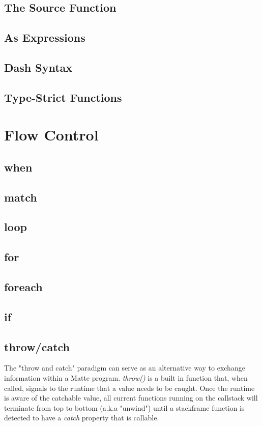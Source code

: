 \documentclass[12pt,letterpaper]{report}
\begin{document}
\section{The Source Function}
\section{As Expressions}
\section{Dash Syntax}
\section{Type-Strict Functions}
\chapter{Flow Control}
\section{when}
\section{match}
\section{loop}
\section{for}
\section{foreach}
\section{if}
\section{throw/catch}

The "throw and catch" paradigm can serve as an alternative way to exchange information within 
a Matte program. \textit{throw()} is a built in function that, when called, signals to the runtime
that a value needs to be caught. Once the runtime is aware of the catchable value, all current 
functions running on the callstack will terminate from top to bottom (a.k.a "unwind") until a 
stackframe function is detected to have a \textit{catch} property that is callable.
\end{document}
